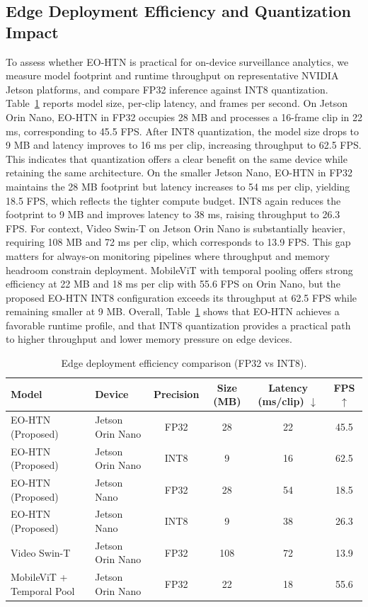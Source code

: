\documentclass[AMA,Times1COL]{WileyNJDv5} %
\begin{document}
\subsection{Edge Deployment Efficiency and Quantization Impact}
To assess whether EO-HTN is practical for on-device surveillance analytics, we measure model footprint and runtime throughput on representative NVIDIA Jetson platforms, and compare FP32 inference against INT8 quantization. Table~\ref{tab:edge_efficiency} reports model size, per-clip latency, and frames per second. On Jetson Orin Nano, EO-HTN in FP32 occupies 28 MB and processes a 16-frame clip in 22 ms, corresponding to 45.5 FPS. After INT8 quantization, the model size drops to 9 MB and latency improves to 16 ms per clip, increasing throughput to 62.5 FPS. This indicates that quantization offers a clear benefit on the same device while retaining the same architecture. On the smaller Jetson Nano, EO-HTN in FP32 maintains the 28 MB footprint but latency increases to 54 ms per clip, yielding 18.5 FPS, which reflects the tighter compute budget. INT8 again reduces the footprint to 9 MB and improves latency to 38 ms, raising throughput to 26.3 FPS. For context, Video Swin-T on Jetson Orin Nano is substantially heavier, requiring 108 MB and 72 ms per clip, which corresponds to 13.9 FPS. This gap matters for always-on monitoring pipelines where throughput and memory headroom constrain deployment. MobileViT with temporal pooling offers strong efficiency at 22 MB and 18 ms per clip with 55.6 FPS on Orin Nano, but the proposed EO-HTN INT8 configuration exceeds its throughput at 62.5 FPS while remaining smaller at 9 MB. Overall, Table~\ref{tab:edge_efficiency} shows that EO-HTN achieves a favorable runtime profile, and that INT8 quantization provides a practical path to higher throughput and lower memory pressure on edge devices.

\begin{table}[t]
\centering
\caption{Edge deployment efficiency comparison (FP32 vs INT8).}
\label{tab:edge_efficiency}
\renewcommand{\arraystretch}{1.1}
\setlength{\tabcolsep}{3.5pt}
\begin{tabular}{|p{3.4cm}|p{3.0cm}|c|c|c|c|}
\hline
\textbf{Model} & \textbf{Device} & \textbf{Precision} & \textbf{Size (MB)} & \textbf{Latency (ms/clip)} $\downarrow$ & \textbf{FPS} $\uparrow$ \\
\hline
EO-HTN (Proposed) & Jetson Orin Nano & FP32 & 28 & 22 & 45.5 \\
\hline
EO-HTN (Proposed) & Jetson Orin Nano & INT8 & 9 & 16 & 62.5 \\
\hline
EO-HTN (Proposed) & Jetson Nano & FP32 & 28 & 54 & 18.5 \\
\hline
EO-HTN (Proposed) & Jetson Nano & INT8 & 9 & 38 & 26.3 \\
\hline
Video Swin-T & Jetson Orin Nano & FP32 & 108 & 72 & 13.9 \\
\hline
MobileViT + Temporal Pool & Jetson Orin Nano & FP32 & 22 & 18 & 55.6 \\
\hline
\end{tabular}%
\end{table}
\end{document}
